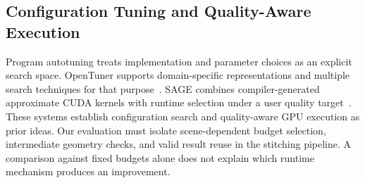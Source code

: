 \subsection{Configuration Tuning and Quality-Aware Execution}
Program autotuning treats implementation and parameter choices as an explicit
search space. OpenTuner supports domain-specific representations and multiple
search techniques for that purpose~\cite{ansel2014opentuner}. SAGE combines
compiler-generated approximate CUDA kernels with runtime selection under a user
quality target~\cite{samadi2013sage}. These systems establish configuration
search and quality-aware GPU execution as prior ideas. Our evaluation must
isolate scene-dependent budget selection, intermediate geometry checks, and
valid result reuse in the stitching pipeline. A comparison against fixed
budgets alone does not explain which runtime mechanism produces an improvement.

